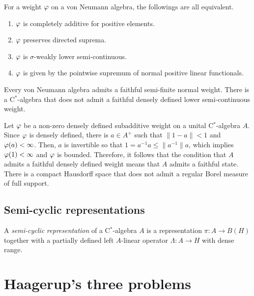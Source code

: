 \documentclass{../../../../small}
\begin{document}
\begin{thm*}[Haagerup, 1975]
For a weight $\varphi$ on a von Neumann algebra, the followings are all equivalent.
\begin{enumerate}[(1)]
\item $\varphi$ is completely additive for positive elements.
\item $\varphi$ preserves directed suprema.
\item $\varphi$ is $\sigma$-weakly lower semi-continuous.
\item $\varphi$ is given by the pointwise supremum of normal positive linear functionals.
\end{enumerate}
\end{thm*}

\begin{rmk*}
Every von Neumann algebra admits a faithful semi-finite normal weight.
There is a C$^*$-algebra that does not admit a faithful densely defined lower semi-continuous weight.

Let $\varphi$ be a non-zero densely defined subadditive weight on a unital C$^*$-algebra $A$.
Since $\varphi$ is densely defined, there is $a\in A^+$ such that $\|1-a\|<1$ and $\varphi(a)<\infty$.
Then, $a$ is invertible so that $1=a^{-1}a\le\|a^{-1}\|a$, which implies $\varphi(1)<\infty$ and $\varphi$ is bounded.
Therefore, it follows that the condition that $A$ admits a faithful densely defined weight means that $A$ admits a faithful state.
There is a compact Hausdorff space that does not admit a regular Borel measure of full support.
\end{rmk*}






\subsection{Semi-cyclic representations}


\begin{defn*}
A \emph{semi-cyclic representation} of a C$^*$-algebra $A$ is a representation $\pi:A\to B(H)$ together with a partially defined left $A$-linear operator $\Lambda:A\to H$ with dense range.

\end{defn*}




\section{Haagerup's three problems}
\end{document}
